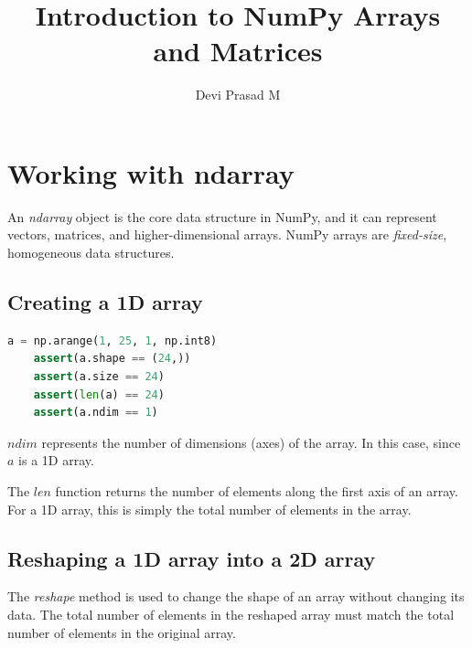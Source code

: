 \documentclass[12pt]{article}
\title{Introduction to NumPy Arrays and Matrices}
\author{Devi Prasad M}
\newcommand{\vsp}{\vspace*{8pt}}
\begin{document}
\pagecolor{yellow!30!brown!20}





\maketitle

\section{Working with ndarray}
An \emph{ndarray} object is the core data structure in NumPy, and
it can represent vectors, matrices, and higher-dimensional arrays.
NumPy arrays are \emph{fixed-size}, homogeneous data structures.

\vsp\subsection{Creating a 1D array}
\begin{lstlisting}[language=Python]
    a = np.arange(1, 25, 1, np.int8)
    assert(a.shape == (24,))
    assert(a.size == 24)
    assert(len(a) == 24)
    assert(a.ndim == 1)
\end{lstlisting}

$ndim$ represents the number of dimensions (axes) of
the array. In this case, since $a$ is a 1D array.

The $len$ function returns the number of elements along the
first axis of an array. For a 1D array, this is simply the total
number of elements in the array.

\subsection{Reshaping a 1D array into a 2D array}
The \emph{reshape} method is used to change the shape of
an array without changing its data. The total number of elements
in the reshaped array must match the total number of elements
in the original array.
\end{document}
